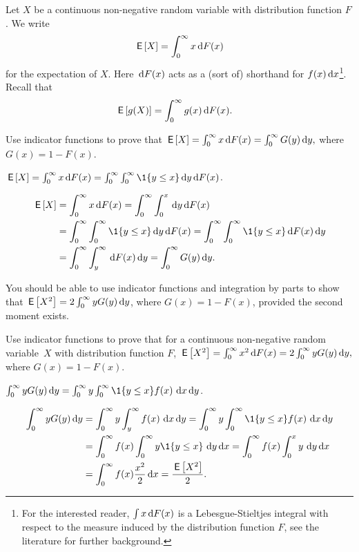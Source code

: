 \documentclass[companion.tex]{subfiles}
\begin{document}
Let $X$ be a continuous non-negative random variable with distribution function $F$. We write 
\begin{equation*}
 \,\mathsf{E}\left[X\right] = \int_0^\infty x \,\text{d}F(x)
\end{equation*}
for the expectation of $X$.
Here $\,\text{d}F(x)$ acts as a (sort of) shorthand for $f(x) \,\text{d}x$\footnote{For the interested reader, $\int x \,\text{d}F(x)$ is a Lebesgue-Stieltjes integral with respect to the measure induced by the distribution function $F$, see the literature for further background.}.
Recall that
\begin{align*}
\,\mathsf{E}\left[g(X)\right] &= \int_0^\infty g(x) \,\text{d}F(x).
\end{align*}



\begin{exercise}
 Use indicator functions to prove that 
$ \,\mathsf{E}\left[X\right] = \int_0^\infty x \,\text{d}F(x) = \int_0^\infty G(y) \,\text{d}y,$
where $G(x) = 1 - F(x)$. 
\begin{hint}
$\E X = \int_0^\infty x \d F(x) = \int_0^\infty \int_0^\infty \1{y\leq x} \d y \d F(x)$.
\end{hint}
\begin{solution}
 \begin{align*}
 \E{X} &= \int_0^\infty x \d F(x) = \int_0^\infty \int_0^x \d y \d F(x) \\
 & = \int_0^\infty \int_0^\infty \1{y\leq x} \d y \d F(x) = \int_0^\infty \int_0^\infty \1{y\leq x} \d F(x) \d y\\
 & = \int_0^\infty \int_y^\infty \d F(x) \d y = \int_0^\infty G(y) \d y.
 \end{align*}
\end{solution}
\end{exercise}

You should be able to use indicator functions and integration by parts to show that $\,\mathsf{E}\left[X^2\right] = 2\int_0^\infty y G(y) \,\text{d}y$, where $G(x) = 1- F(x)$, provided the second moment exists.

\begin{extra}
 Use indicator functions to prove that for a continuous non-negative random variable~$X$ with distribution function $F$, $ \,\mathsf{E}\left[X^2\right] = \int_0^\infty x^2 \,\text{d}F(x) = 2 \int_0^\infty y G(y) \,\text{d}y,$ where $G(x) = 1 - F(x)$.
\begin{hint}
$\int_0^\infty y G(y) \d y = \int_0^\infty y \int_0^\infty \1{y\leq x}f(x)\, \d x \d y$.
\end{hint}
\begin{solution}
 \begin{align*}
\int_0^\infty y G(y) \d y 
&= \int_0^\infty y \int_y^\infty f(x)\, \d x \d y = \int_0^\infty y \int_0^\infty \1{y\leq x}f(x)\, \d x \d y\\
&= \int_0^\infty f(x) \int_0^\infty y \1{y \leq x}\, \d y \d x
= \int_0^\infty f(x) \int_0^x y\, \d y \d x\\
&= \int_0^\infty f(x) \frac{x^2}2 \d x =\frac{\E{X^2}}2.
 \end{align*}
\end{solution}
\end{extra}
\end{document}
